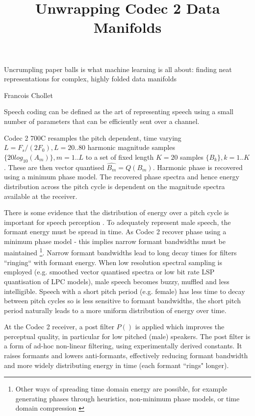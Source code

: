 \documentclass{article}
\begin{document}
\title{Unwrapping Codec 2 Data Manifolds}
\maketitle

\epigraph{Uncrumpling paper balls is what machine learning is all about: finding neat representations for complex, highly folded data manifolds}{Francois Chollet \cite{chollet2018deep}}

Speech coding can be defined as the art of representing speech using a small number of parameters that can be efficiently sent over a channel.

Codec 2 700C resamples the pitch dependent, time varying $L=F_s/(2F_0), L=20..80$ harmonic magnitude samples $\{20log_{10}(A_m)\}, m=1..L$ to a set of fixed length $K=20$ samples $\{B_k\},k=1..K$.  These are then vector quantised $\hat{B_m}=Q(B_m)$.  Harmonic phase is recovered using a minimum phase model. The recovered phase spectra and hence energy distribution across the pitch cycle is dependent on the magnitude spectra available at the receiver.

There is some evidence that the distribution of energy over a pitch cycle is important for speech perception \cite{rowe2023_ratek_study}. To adequately represent male speech, the formant energy must be spread in time.  As Codec 2 recover phase using a minimum phase model - this implies narrow formant bandwidths must be maintained \footnote{Other ways of spreading time domain energy are possible, for example generating phases through heuristics, non-minimum phase models, or time domain compression \cite{rowe2023_ratek_study}}.  Narrow formant bandwidths lead to long decay times for filters ``ringing`` with formant energy. When low resolution spectral sampling is employed (e.g. smoothed vector quantised spectra or low bit rate LSP quantisation of LPC models), male speech becomes buzzy, muffled and less intelligible.  Speech with a short pitch period (e.g. female) has less time to decay between pitch cycles so is less sensitive to formant bandwidths, the short pitch period naturally leads to a more uniform distribution of energy over time.

At the Codec 2 receiver, a post filter $P()$ is applied which improves the perceptual quality, in particular for low pitched (male) speakers. The post filter is a form of ad-hoc non-linear filtering, using experimentally derived constants.  It raises formants and lowers anti-formants, effectively reducing formant bandwidth and more widely distributing energy in time (each formant ``rings" longer).
\end{document}
